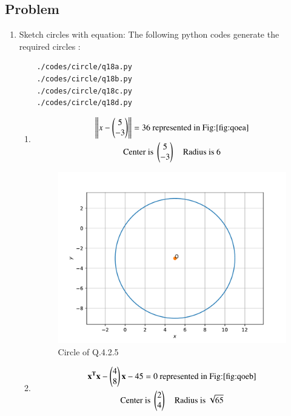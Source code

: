 \subsection{Problem}

\renewcommand{\theequation}{\theenumi}
\begin{enumerate}[label=\thesection.\arabic*.,ref=\thesection.\theenumi]
\item Sketch circles with equation:
The following python codes generate the required circles :
	\begin{lstlisting}
	./codes/circle/q18a.py
	./codes/circle/q18b.py
	./codes/circle/q18c.py
	./codes/circle/q18d.py
	\end{lstlisting}


\begin{enumerate}
\item \begin{multline} 
\left\lVert x - \begin{pmatrix}5\\-3\end{pmatrix}\right\rVert = 36\text{ represented in Fig:\ref{fig:qoea}}
\\
\text{Center is }\begin{pmatrix}5\\-3\end{pmatrix}\quad\text{Radius is }6
\end{multline}

	\begin{figure}[!ht]
	\centering
	\includegraphics[width=\columnwidth]{./figs/circle/q18a.pdf}
	\caption{Circle of Q.4.2.5}
	\label{fig:qoea}	
	\end{figure}


\item \begin{multline} 
\mathbf{x^Tx} - \begin{pmatrix}4\\8\end{pmatrix}\mathbf{x} -45 = 0\text{ represented in Fig:\ref{fig:qoeb}}
\\
\text{Center is }\begin{pmatrix}2\\4\end{pmatrix}\quad\text{Radius is }\sqrt{65}
\end{multline}


\end{enumerate}
\end{enumerate}

